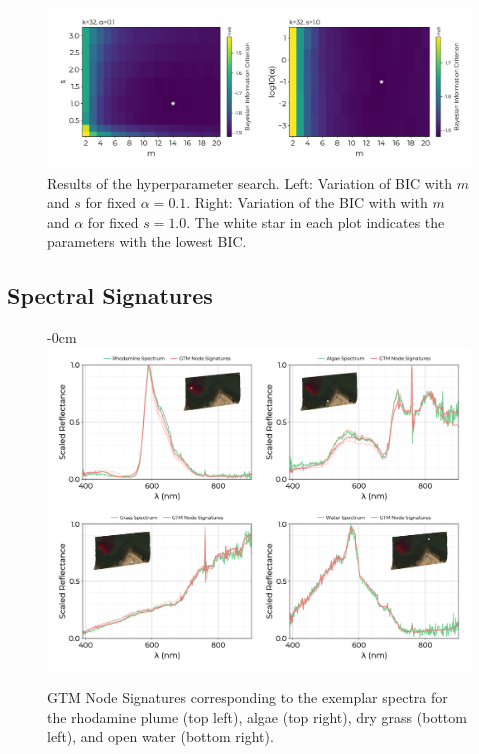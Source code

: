 \documentclass[remotesensing,article,submit,pdftex,moreauthors]{Definitions/mdpi}
\begin{document}
\begin{figure}[t]
\centering
\includegraphics[width=\textwidth]{paper/figures/results/bic.pdf}
\caption{Results of the hyperparameter search. Left: Variation of BIC with $m$ and $s$ for fixed $\alpha=0.1$. Right: Variation of the BIC with with $m$ and $\alpha$ for fixed $s=1.0$. The white star in each plot indicates the parameters with the lowest BIC.\label{fig:hp-results}}
\end{figure}  


\subsection{Spectral Signatures}


\begin{figure}[t]
\begin{adjustwidth}{-\extralength}{0cm}
\centering
\includegraphics[width=15.5cm]{paper/figures/results/spectral-signatures.png}
\end{adjustwidth}
\caption{GTM Node Signatures corresponding to the exemplar spectra for the rhodamine plume (top left), algae (top right), dry grass (bottom left), and open water (bottom right). \label{fig:spectral-signatures}}
\end{figure}  
\end{document}
